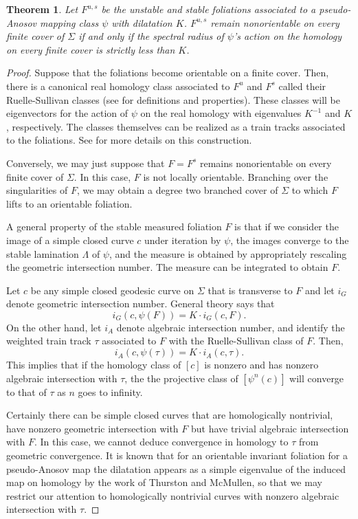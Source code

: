 \documentclass[11pt]{amsart}
\newtheorem{thm}{Theorem}
\numberwithin{thm}{section}
\begin{document}
\begin{thm}
Let $F^{u,s}$ be the unstable and stable foliations associated to a pseudo-Anosov mapping class $\psi$ with dilatation $K$.  $F^{u,s}$ remain nonorientable on every finite cover of $\Sigma$ if and only if the spectral radius of $\psi$'s action on the homology on every finite cover is strictly less than $K$.
\end{thm}
\begin{proof}
Suppose that the foliations become orientable on a finite cover.  Then, there is a canonical real homology class associated to $F^u$ and $F^s$ called their Ruelle-Sullivan classes (see \cite{RS} for definitions and properties).  These classes will be eigenvectors for the action of $\psi$ on the real homology with eigenvalues $K^{-1}$ and $K$, respectively.  The classes themselves can be realized as a train tracks associated to the foliations.  See \cite{PH} for more details on this construction.

Conversely, we may just suppose that $F=F^s$ remains nonorientable on every finite cover of $\Sigma$.  In this case, $F$ is not locally orientable.  Branching over the singularities of $F$, we may obtain a degree two branched cover of $\Sigma$ to which $F$ lifts to an orientable foliation.

A general property of the stable measured foliation $F$ is that if we consider the image of a simple closed curve $c$ under iteration by $\psi$, the images converge to the stable lamination $\Lambda$ of $\psi$, and the measure is obtained by appropriately rescaling the geometric intersection number.  The measure can be integrated to obtain $F$.

Let $c$ be any simple closed geodesic curve on $\Sigma$ that is transverse to $F$ and let $i_G$ denote geometric intersection number.  General theory says that \[i_G(c,\psi(F))=K\cdot i_G(c,F).\]  On the other hand, let $i_A$ denote algebraic intersection number, and identify the weighted train track $\tau$ associated to $F$ with the Ruelle-Sullivan class of $F$.  Then, \[i_A(c,\psi(\tau))=K\cdot i_A(c,\tau).\]  This implies that if the homology class of $[c]$ is nonzero and has nonzero algebraic intersection with $\tau$, the the projective class of $[\psi^n(c)]$ will converge to that of $\tau$ as $n$ goes to infinity.

Certainly there can be simple closed curves that are homologically nontrivial, have nonzero geometric intersection with $F$ but have trivial algebraic intersection with $F$.  In this case, we cannot deduce convergence in homology to $\tau$ from geometric convergence.  It is known that for an orientable invariant foliation for a pseudo-Anosov map the dilatation appears as a simple eigenvalue of the induced map on homology by the work of Thurston and McMullen, so that we may restrict our attention to homologically nontrivial curves with nonzero algebraic intersection with $\tau$.


\end{proof}
\end{document}
